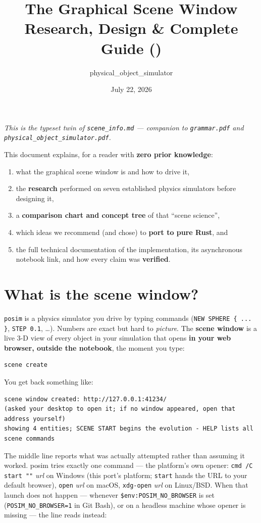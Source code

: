 \documentclass[11pt]{article}
\title{The \code{posim} Graphical Scene Window\\[2pt]
       \large Research, Design \& Complete Guide (\code{scene\_info})}
\author{physical\_object\_simulator}
\date{July 22, 2026}
\newcommand{\code}[1]{\texttt{#1}}
\begin{document}
\maketitle

\noindent\emph{This is the typeset twin of \code{scene\_info.md} ---
companion to \code{grammar.pdf} and
\code{physical\_object\_simulator.pdf}.}

This document explains, for a reader with \textbf{zero prior knowledge}:
\begin{enumerate}
\item what the graphical scene window is and how to drive it,
\item the \textbf{research} performed on seven established physics
      simulators before designing it,
\item a \textbf{comparison chart and concept tree} of that ``scene
      science'',
\item which ideas we recommend (and chose) to \textbf{port to pure
      Rust}, and
\item the full technical documentation of the implementation, its
      asynchronous notebook link, and how every claim was
      \textbf{verified}.
\end{enumerate}

\tableofcontents

\section{What is the scene window?}

\code{posim} is a physics simulator you drive by typing commands
(\code{NEW SPHERE \{ ... \}}, \code{STEP 0.1}, \ldots). Numbers are
exact but hard to \emph{picture}. The \textbf{scene window} is a live
3-D view of every object in your simulation that opens \textbf{in your
web browser, outside the notebook}, the moment you type:

\begin{lstlisting}
scene create
\end{lstlisting}

You get back something like:

\begin{lstlisting}
scene window created: http://127.0.0.1:41234/
(asked your desktop to open it; if no window appeared, open that address yourself)
showing 4 entities; SCENE START begins the evolution - HELP lists all scene commands
\end{lstlisting}

The middle line reports what was actually attempted rather than assuming
it worked. posim tries exactly one command --- the platform's own
opener: \code{cmd /C start ""} \textit{url} on Windows (this port's
platform; \code{start} hands the URL to your default browser),
\code{open} \textit{url} on macOS, \code{xdg-open} \textit{url} on
Linux/BSD. When that launch does not happen --- whenever
\verb|$env:POSIM_NO_BROWSER| is set (\verb|POSIM_NO_BROWSER=1| in Git
Bash), or on a headless machine whose opener is missing --- the line
reads instead:
\end{document}
